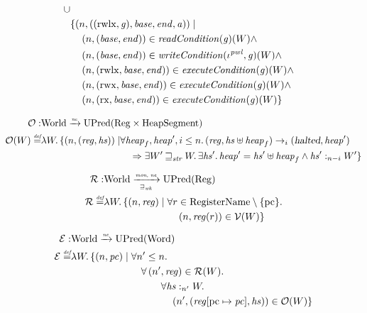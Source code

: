\documentclass[a4paper]{article}
\newcommand{\update}[2]{[#1 \mapsto #2]}
\newcommand{\nefun}{\xrightarrow{\textit{\tiny{ne}}}}
\newcommand{\defeq}{\stackrel{\textit{\tiny{def}}}{=}}
\newcommand{\union}{\mathbin{\cup}}
\newcommand{\var}[1]{\mathit{#1}}
\newcommand{\hs}{\var{hs}}
\newcommand{\gl}{\var{g}}
\newcommand{\pc}{\mathit{pc}}
\newcommand{\pcreg}{\mathrm{pc}}
\newcommand{\addr}{\var{a}}
\newcommand{\start}{\var{base}}
\newcommand{\addrend}{\var{end}}
\newcommand{\reg}{\var{reg}}
\newcommand{\heap}{\var{heap}}
\newcommand{\perm}{\var{perm}}
\newcommand{\stdcap}[1][(\perm,\gl)]{\left(#1,\start,\addrend,\addr \right)}
\newcommand{\halted}{\textsl{halted}}
\newcommand{\plainfun}[2]{
  \ifthenelse{\equal{#2}{}}
             {\mathit{#1}}
             {\mathit{#1}(#2)}
}
\newcommand{\readCond}[1]{\plainfun{readCondition}{#1}}
\newcommand{\writeCond}[1]{\plainfun{writeCondition}{#1}}
\newcommand{\execCond}[1]{\plainfun{executeCondition}{#1}}
\newcommand{\futurewk}{\mathbin{\sqsupseteq}_{\var{wk}}}
\newcommand{\futurestr}{\mathbin{\sqsupseteq}_{\var{str}}}
\newcommand{\heapSat}[3][\heap]{#1 :_{#2} #3}
\newcommand{\monwknefun}{\xrightarrow[\text{\tiny{$\futurewk$}}]{\textit{\tiny{mon, ne}}}}
\newcommand{\asmType}{\plaindom{AsmType}}
\newcommand{\plaindom}[1]{\mathrm{#1}}
\newcommand{\Words}{\plaindom{Word}}
\newcommand{\RegName}{\plaindom{RegisterName}}
\newcommand{\Regs}{\plaindom{Reg}}
\newcommand{\HeapSegments}{\plaindom{HeapSegment}}
\newcommand{\Worlds}{\plaindom{World}}
\newcommand{\UPred}[1]{\plaindom{UPred}(#1)}
\newcommand{\intr}[2]{\mathcal{#1}}
\newcommand{\valueintr}[1]{\intr{V}{#1}}
\newcommand{\exprintr}[1]{\intr{E}{#1}}
\newcommand{\regintr}[1]{\intr{R}{#1}}
\newcommand{\stdvr}{\valueintr{\asmType}}
\newcommand{\stder}{\exprintr{\asmType}}
\newcommand{\stdrr}{\regintr{\asmType}}
\newcommand{\observations}{\mathcal{O}}
\newcommand{\npair}[2][n]{\left(#1,#2 \right)}
\newcommand{\plainperm}[1]{\mathrm{#1}}
\newcommand{\exec}{\plainperm{rx}}
\newcommand{\rwx}{\plainperm{rwx}}
\newcommand{\rwlx}{\plainperm{rwlx}}
\newcommand{\step}[1][]{\rightarrow_{#1}}
\begin{document}
\begin{align*}
\begin{aligned}[t]
             \union \\
             & \{ \npair{\stdcap[(\rwlx,\gl)]} \mid \\
             & \quad \npair{(\start,\addrend)} \in \readCond{}(\gl)(W) \land \\
             & \quad \npair{(\start,\addrend)} \in \writeCond{}(\iota^{\var{pwl}},\gl)(W) \land\\
             & \quad \npair{(\rwlx,\start,\addrend)} \in \execCond{}(\gl)(W) \land \\
             & \quad \npair{(\rwx,\start,\addrend)} \in \execCond{}(\gl)(W) \land \\
             & \quad \npair{(\exec,\start,\addrend)} \in \execCond{}(\gl)(W) \}
           \end{aligned}
\end{align*}

\begin{align*}
  \observations : &  \Worlds \nefun \UPred{\Regs \times \HeapSegments} \\
  \observations (W) \defeq & \lambda W \ldotp 
                             \begin{aligned}[t]
                               \{ \npair{(\reg,\hs)} \mid & \forall \heap_f, \heap', i \leq n \ldotp (\reg,\hs \uplus \heap_f) \step[i] (\halted,\heap')  \\
                                                          & \quad \Rightarrow \exists W' \futurestr W \ldotp\exists \hs' \ldotp \heap' = \hs' \uplus \heap_f \land \heapSat[\hs']{n-i}{W'} \}
                             \end{aligned}
\end{align*}

\begin{align*}
  \stdrr : & \Worlds \monwknefun \UPred{\Regs} \\
  \stdrr \defeq & \lambda W \ldotp
                     \begin{aligned}[t]
                       \{ \npair{\reg} \mid & \;\forall r \in \RegName \setminus \{\pcreg\} \ldotp \\
                                            & \;\quad  \npair{\reg(r)} \in \stdvr(W) \}
                     \end{aligned}
\end{align*}

\begin{align*}
  \stder : & \Worlds \nefun \UPred{\Words} \\
  \stder \defeq & \lambda W \ldotp \{ \npair{\pc} \mid 
  \begin{aligned}[t]
    & \forall n' \leq n \ldotp\\
    & \quad \forall \npair[n']{\reg} \in \stdrr(W) \ldotp \\
    & \quad \qquad  \forall \heapSat[\hs]{n'}{W} \ldotp \\
    & \quad \qquad \quad \npair[n']{(\reg\update{\pcreg}{\pc},\hs)} \in \observations(W) \}
  \end{aligned}
\end{align*}
\end{document}
